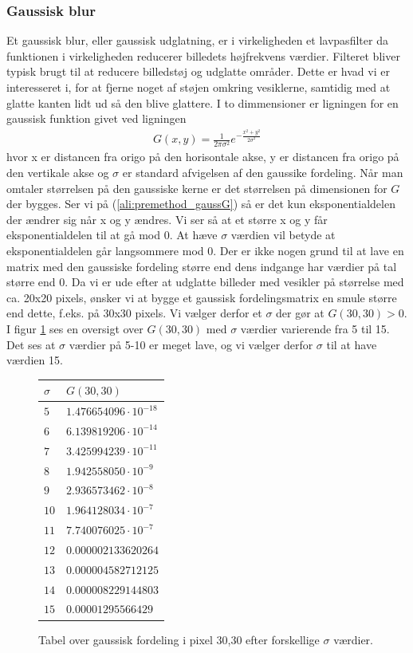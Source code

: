 \subsubsection{Gaussisk blur}
Et gaussisk blur, eller gaussisk udglatning, er i virkeligheden et lavpasfilter da funktionen i virkeligheden reducerer billedets højfrekvens værdier. Filteret bliver typisk brugt til at reducere billedstøj og udglatte områder. Dette er hvad vi er interesseret i, for at fjerne noget af støjen omkring vesiklerne, samtidig med at glatte kanten lidt ud så den blive glattere. I to dimmensioner er ligningen for en gaussisk funktion givet ved ligningen
\begin{align}
	G(x,y) = \frac{1}{2\pi\sigma^2}e^{-\frac{x^2+y^2}{2\sigma^2}}\label{ali:premethod_gaussG}
\end{align}
hvor x er distancen fra origo på den horisontale akse, y er distancen fra origo på den vertikale akse og $\sigma$ er standard afvigelsen af den gaussike fordeling. Når man omtaler størrelsen på den gaussiske kerne er det størrelsen på dimensionen for $G$ der bygges. Ser vi på (\ref{ali:premethod_gaussG}) så er det kun eksponentialdelen der ændrer sig når x og y ændres. Vi ser så at et større x og y får eksponentialdelen til at gå mod 0. At hæve $\sigma$ værdien vil betyde at eksponentialdelen går langsommere mod 0. Der er ikke nogen grund til at lave en matrix med den gaussiske fordeling større end dens indgange har værdier på tal større end 0. Da vi er ude efter at udglatte billeder med vesikler på størrelse med ca. 20x20 pixels, ønsker vi at bygge et gaussisk fordelingsmatrix en smule større end dette, f.eks. på 30x30 pixels. Vi vælger derfor et $\sigma$ der gør at $G(30,30) > 0$. I figur \ref{fig:premethod_gauss_table} ses en oversigt over $G(30,30)$ med $\sigma$ værdier varierende fra 5 til 15. Det ses at $\sigma$ værdier på 5-10 er meget lave, og vi vælger derfor $\sigma$ til at have værdien 15.  
 
\begin{figure}[H]
	\centering
	\begin{tabular}{l | l}
			\textbf{$\sigma$} & $G(30,30)$\\
			\hline
			$5$ & $1.476654096\cdot10^{-18}$\\
			$6$ & $6.139819206\cdot10^{-14}$\\
			$7$ & $3.425994239\cdot10^{-11}$\\
			$8$ & $1.942558050\cdot10^{-9}$\\
			$9$ & $2.936573462\cdot10^{-8}$\\
			$10$ & $1.964128034\cdot10^{-7}$\\
			$11$ & $7.740076025\cdot10^{-7}$\\
			$12$ & $0.000002133620264$\\
			$13$ & $0.000004582712125$\\
			$14$ & $0.000008229144803$\\
			$15$ & $0.00001295566429$
	\end{tabular}
	\caption{Tabel over gaussisk fordeling i pixel 30,30 efter forskellige $\sigma$ værdier.\label{fig:premethod_gauss_table}}
\end{figure}

